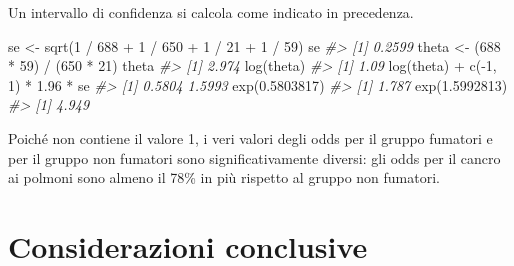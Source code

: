 \documentclass[
  11pt,
]{krantz}
\makeatletter
\newenvironment{Shaded}{\begin{snugshade}}{\end{snugshade}}
\newcommand{\CommentTok}[1]{\textcolor[rgb]{0.37,0.37,0.37}{\textit{#1}}}
\newcommand{\DecValTok}[1]{\textcolor[rgb]{0.06,0.06,0.06}{#1}}
\newcommand{\FloatTok}[1]{\textcolor[rgb]{0.06,0.06,0.06}{#1}}
\newcommand{\FunctionTok}[1]{\textcolor[rgb]{0,0,0}{#1}}
\newcommand{\NormalTok}[1]{#1}
\newcommand{\OtherTok}[1]{\textcolor[rgb]{0.37,0.37,0.37}{#1}}
\newcommand{\SpecialCharTok}[1]{\textcolor[rgb]{0,0,0}{#1}}
\newenvironment{kframe}{%
\medskip{}
\setlength{\fboxsep}{.8em}
 \def\at@end@of@kframe{}%
 \ifinner\ifhmode%
  \def\at@end@of@kframe{\end{minipage}}%
  \begin{minipage}{\columnwidth}%
 \fi\fi%
 \def\FrameCommand##1{\hskip\@totalleftmargin \hskip-\fboxsep
 \colorbox{shadecolor}{##1}\hskip-\fboxsep
     \hskip-\linewidth \hskip-\@totalleftmargin \hskip\columnwidth}%
 \MakeFramed {\advance\hsize-\width
   \@totalleftmargin\z@ \linewidth\hsize
   \@setminipage}}%
 {\par\unskip\endMakeFramed%
 \at@end@of@kframe}
\renewenvironment{Shaded}{\begin{kframe}}{\end{kframe}}
\theoremstyle{definition}
\theoremstyle{definition}
\theoremstyle{definition}
\theoremstyle{definition}
\theoremstyle{remark}
\makeatother
\begin{document}
Un intervallo di confidenza si calcola come indicato in precedenza.

\begin{Shaded}
\begin{Highlighting}[]
\NormalTok{se }\OtherTok{\textless{}{-}} \FunctionTok{sqrt}\NormalTok{(}\DecValTok{1} \SpecialCharTok{/} \DecValTok{688} \SpecialCharTok{+} \DecValTok{1} \SpecialCharTok{/} \DecValTok{650} \SpecialCharTok{+} \DecValTok{1} \SpecialCharTok{/} \DecValTok{21} \SpecialCharTok{+} \DecValTok{1} \SpecialCharTok{/} \DecValTok{59}\NormalTok{)}
\NormalTok{se}
\CommentTok{\#\textgreater{} [1] 0.2599}
\NormalTok{theta }\OtherTok{\textless{}{-}}\NormalTok{ (}\DecValTok{688} \SpecialCharTok{*} \DecValTok{59}\NormalTok{) }\SpecialCharTok{/}\NormalTok{ (}\DecValTok{650} \SpecialCharTok{*} \DecValTok{21}\NormalTok{)}
\NormalTok{theta}
\CommentTok{\#\textgreater{} [1] 2.974}
\FunctionTok{log}\NormalTok{(theta)}
\CommentTok{\#\textgreater{} [1] 1.09}
\FunctionTok{log}\NormalTok{(theta) }\SpecialCharTok{+} \FunctionTok{c}\NormalTok{(}\SpecialCharTok{{-}}\DecValTok{1}\NormalTok{, }\DecValTok{1}\NormalTok{) }\SpecialCharTok{*} \FloatTok{1.96} \SpecialCharTok{*}\NormalTok{ se}
\CommentTok{\#\textgreater{} [1] 0.5804 1.5993}
\FunctionTok{exp}\NormalTok{(}\FloatTok{0.5803817}\NormalTok{)}
\CommentTok{\#\textgreater{} [1] 1.787}
\FunctionTok{exp}\NormalTok{(}\FloatTok{1.5992813}\NormalTok{)}
\CommentTok{\#\textgreater{} [1] 4.949}
\end{Highlighting}
\end{Shaded}

Poiché non contiene il valore 1, i veri valori degli odds per il gruppo fumatori e per il gruppo non fumatori sono significativamente diversi: gli odds per il cancro ai polmoni sono almeno il 78\% in più rispetto al gruppo non fumatori.

\hypertarget{considerazioni-conclusive-1}{%
\section*{Considerazioni conclusive}\label{considerazioni-conclusive-1}}
\end{document}
